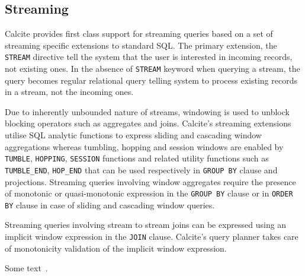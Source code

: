 \subsection{Streaming}
\label{subsec:streaming}

Calcite provides first class support for streaming queries based on a set of streaming specific extensions to standard SQL. The primary extension, the \texttt{STREAM} directive tell the system that the user is interested in incoming records, not existing ones. In the absence of \texttt{STREAM} keyword when querying a stream, the query becomes regular relational query telling system to process existing records in a stream, not the incoming ones. 

Due to inherently unbounded nature of streams, windowing is used to unblock blocking operators such as aggregates and joins. Calcite's streaming extensions utilise SQL analytic functions to express sliding and cascading window aggregations whereas tumbling, hopping and session windows are enabled by \texttt{TUMBLE}, \texttt{HOPPING}, \texttt{SESSION} functions and related utility functions such as \texttt{TUMBLE\_END}, \texttt{HOP\_END} that can be used respectively in \texttt{GROUP BY} clause and projections. Streaming queries involving window aggregates require the presence of monotonic or quasi-monotonic expression in the \texttt{GROUP BY} clause or in \texttt{ORDER BY} clause in case of sliding and cascading window queries.

Streaming queries involving stream to stream joins can be expressed using an implicit window expression in the \texttt{JOIN} clause. Calcite's query  planner takes care of monotonicity validation of the implicit window expression.




Some text~\cite{DBLP:journals/cacm/Hyde10}.
